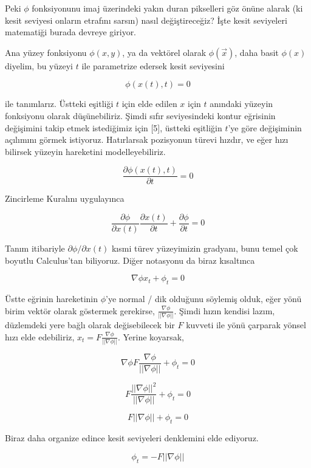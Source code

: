 \documentclass[12pt,fleqn]{article}\usepackage{../../common}
\begin{document}
Peki $\phi$ fonksiyonunu imaj üzerindeki yakın duran pikselleri göz önüne alarak
(ki kesit seviyesi onların etrafını sarsın) nasıl değiştireceğiz? İşte kesit
seviyeleri matematiği burada devreye giriyor.

Ana yüzey fonksiyonu $\phi(x,y)$, ya da vektörel olarak $\phi(\vec{x})$, daha
basit $\phi(x)$ diyelim, bu yüzeyi $t$ ile parametrize edersek kesit seviyesini

$$
\phi(x(t), t) = 0
$$

ile tanımlarız. Üstteki eşitliği $t$ için elde edilen $x$ için $t$ anındaki
yüzeyin fonksiyonu olarak düşünebiliriz. Şimdi sıfır seviyesindeki kontur
eğrisinin değişimini takip etmek istediğimiz için [5], üstteki eşitliğin $t$'ye
göre değişiminin açılımını görmek istiyoruz. Hatırlarsak pozisyonun türevi
hızdır, ve eğer hızı bilirsek yüzeyin hareketini modelleyebiliriz.

$$
\frac{\partial \phi(x(t),t)}{\partial t} = 0
$$

Zincirleme Kuralını uygulayınca

$$
\frac{\partial \phi}{\partial x(t)} \frac{\partial x(t)}{\partial t} +
\frac{\partial \phi}{\partial t} = 0
$$

Tanım itibariyle $\partial \phi / \partial x(t)$ kısmi türev yüzeyimizin
gradyanı, bunu temel çok boyutlu Calculus'tan biliyoruz. Diğer notasyonu da
biraz kısaltınca

$$
\nabla \phi x_t + \phi_t = 0
$$

Üstte eğrinin hareketinin $\phi$'ye normal / dik olduğunu söylemiş olduk,
eğer yönü birim vektör olarak göstermek gerekirse, $\frac{\nabla \phi}{||\nabla \phi ||}$.
Şimdi hızın kendisi lazım, düzlemdeki yere bağlı olarak değisebilecek
bir $F$ kuvveti ile yönü çarparak yönsel hızı elde edebiliriz,
$x_t = F \frac{\nabla \phi}{||\nabla \phi ||} $. Yerine koyarsak,

$$
\nabla \phi F \frac{\nabla \phi}{||\nabla \phi ||}  + \phi_t = 0
$$

$$
F \frac{||\nabla \phi||^2}{||\nabla \phi ||}  + \phi_t = 0
$$

$$
F ||\nabla \phi||  + \phi_t = 0
$$

Biraz daha organize edince kesit seviyeleri denklemini elde ediyoruz.

$$
\phi_t = - F ||\nabla \phi|| 
$$
\end{document}
